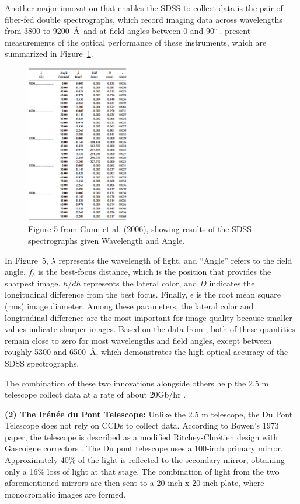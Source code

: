 \documentclass[preprint,linenumbers, longauthor]{aastex631}
\begin{document}
Another major innovation that enables the SDSS to collect data is the pair of fiber-fed double spectrographs, which record imaging data across wavelengths from 3800 to 9200~\AA\ and at field angles between 0 and 90$^{\circ}$ \cite{gunn25TelescopeSloan2006}. 
present measurements of the optical performance of these instruments, which are summarized in Figure~\ref{fig:SDSS_Table}.

\begin{figure}[h!]
  \centering
  \includegraphics[width=0.4\textwidth]{gunn_table_5.png}
  \caption{Figure 5 from Gunn et al. (2006), showing results of the SDSS spectrographs given Wavelength and Angle.}
  \label{fig:SDSS_Table}
\end{figure}

In Figure~5, $\lambda$ represents the wavelength of light, and “Angle” refers to the field angle. 
$f_b$ is the best-focus distance, which is the position that provides the sharpest image. 
$h/dh$ represents the lateral color, and $D$ indicates the longitudinal difference from the best focus. 
Finally, $\epsilon$ is the root mean square (rms) image diameter. 
Among these parameters, the lateral color and longitudinal difference are the most important for image quality because smaller values indicate sharper images. 
Based on the data from \cite{gunn25TelescopeSloan2006}, both of these quantities remain close to zero for most wavelengths and field angles, except between roughly 5300 and 6500~\AA, which demonstrates the high optical accuracy of the SDSS spectrographs.

The combination of these two innovations alongside others help the 2.5 m telescope collect data at a rate of about 20Gb/hr \cite{luptonSDSSImagingPipelines2007}.

\textbf{(2) The Irénée du Pont Telescope:}  
Unlike the 2.5 m telescope, the Du Pont Telescope does not rely on CCDs to collect data. According to Bowen's 1973 paper, the telescope is described as a modified Ritchey-Chrétien design with Gascoigne correctors \cite{bowenOpticalDesign40in1973}.
The Du pont telescope uses a 100-inch primary mirror. Approximately 40\% of the light is reflected to the secondary mirror, obtaining only a 16\% loss of light at that stage. \cite{bowenOpticalDesign40in1973}
The combination of light from the two aforementioned mirrors are then sent to a 20 inch x 20 inch plate, where monocromatic images are formed.
\end{document}
